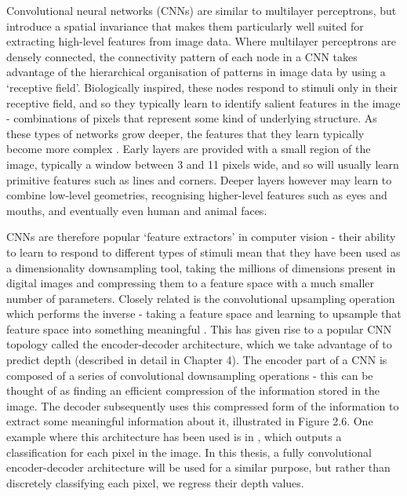 Convolutional neural networks (CNNs) are similar to multilayer perceptrons, but introduce a spatial invariance that makes them particularly well suited for extracting high-level features from image data. Where multilayer perceptrons are densely connected, the connectivity pattern of each node in a CNN takes advantage of the hierarchical organisation of patterns in image data by using a `receptive field'. Biologically inspired, these nodes respond to stimuli only in their receptive field, and so they typically learn to identify salient features in the image - combinations of pixels that represent some kind of underlying structure. As these types of networks grow deeper, the features that they learn typically become more complex \cite{lecun1989cnn}. Early layers are provided with a small region of the image, typically a window between 3 and 11 pixels wide, and so will usually learn primitive features such as lines and corners. Deeper layers however may learn to combine low-level geometries, recognising higher-level features such as eyes and mouths, and eventually even human and animal faces.


CNNs are therefore popular `feature extractors' in computer vision - their ability to learn to respond to different types of stimuli mean that they have been used as a dimensionality downsampling tool, taking the millions of dimensions present in digital images  and compressing them to a feature space with a much smaller number of parameters. Closely related is the convolutional upsampling operation which performs the inverse - taking a feature space and learning to upsample that feature space into something meaningful \cite{long2014fcn}. This has given rise to a popular CNN topology called the encoder-decoder architecture, which we take advantage of to predict depth (described in detail in Chapter 4). The encoder part of a CNN is composed of a series of convolutional downsampling operations - this can be thought of as finding an efficient compression of the information stored in the image. The decoder subsequently uses this compressed form of the information to extract some meaningful information about it, illustrated in Figure 2.6. One example where this architecture has been used is in \cite{long2014fcn}, which outputs a classification for each pixel in the image. In this thesis, a fully convolutional encoder-decoder architecture will be used for a similar purpose, but rather than discretely classifying each pixel, we regress their depth values. 



